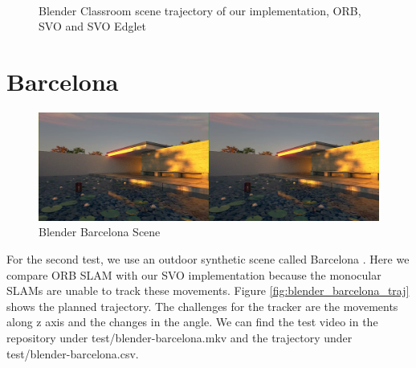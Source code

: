 \documentclass[11pt,a4paper,titlepage,oneside]{report}
\begin{document}
\begin{figure}[H]
  \centering
  \\
  \caption{Blender Classroom scene trajectory of our implementation, ORB, SVO and SVO Edglet}\label{fig:blender_classroom_comp}
\end{figure}

\section{Barcelona}

\begin{figure}[H]
  \includegraphics[width=1.0\textwidth]{img/blender_barcelona_scene.png}
  \caption{Blender Barcelona Scene}\label{fig:blender_barcelona_scene}
\end{figure}

For the second test, we use an outdoor synthetic scene called Barcelona \cite{blender}. Here we compare ORB SLAM with our SVO implementation because the monocular SLAMs are unable to track these movements. Figure \ref{fig:blender_barcelona_traj} shows the planned trajectory. The challenges for the tracker are the movements along z axis and the changes in the angle. We can find the test video in the repository under test/blender-barcelona.mkv and the trajectory under test/blender-barcelona.csv.
\end{document}
